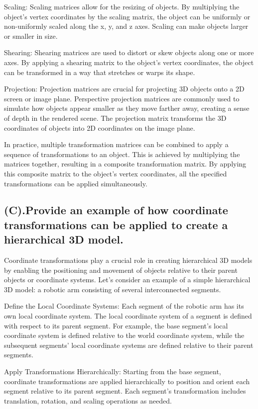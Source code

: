 \documentclass{article}
\begin{document}
\begin{itemize}
Scaling: Scaling matrices allow for the resizing of objects. By multiplying the object's vertex coordinates by the scaling matrix, the object can be uniformly or non-uniformly scaled along the x, y, and z axes. Scaling can make objects larger or smaller in size.

Shearing: Shearing matrices are used to distort or skew objects along one or more axes. By applying a shearing matrix to the object's vertex coordinates, the object can be transformed in a way that stretches or warps its shape.

Projection: Projection matrices are crucial for projecting 3D objects onto a 2D screen or image plane. Perspective projection matrices are commonly used to simulate how objects appear smaller as they move farther away, creating a sense of depth in the rendered scene. The projection matrix transforms the 3D coordinates of objects into 2D coordinates on the image plane.

In practice, multiple transformation matrices can be combined to apply a sequence of transformations to an object. This is achieved by multiplying the matrices together, resulting in a composite transformation matrix. By applying this composite matrix to the object's vertex coordinates, all the specified transformations can be applied simultaneously.
\subsection{(C).Provide an example of how coordinate transformations can be applied to create a hierarchical 3D model.}
Coordinate transformations play a crucial role in creating hierarchical 3D models by enabling the positioning and movement of objects relative to their parent objects or coordinate systems. Let's consider an example of a simple hierarchical 3D model: a robotic arm consisting of several interconnected segments.

Define the Local Coordinate Systems: Each segment of the robotic arm has its own local coordinate system. The local coordinate system of a segment is defined with respect to its parent segment. For example, the base segment's local coordinate system is defined relative to the world coordinate system, while the subsequent segments' local coordinate systems are defined relative to their parent segments.

Apply Transformations Hierarchically: Starting from the base segment, coordinate transformations are applied hierarchically to position and orient each segment relative to its parent segment. Each segment's transformation includes translation, rotation, and scaling operations as needed.


\end{itemize}
\end{document}
